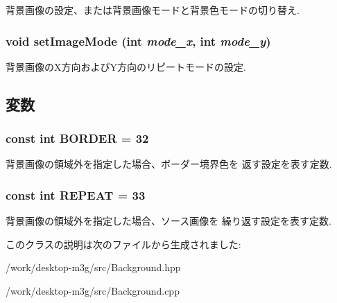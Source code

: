 背景画像の設定、または背景画像モードと背景色モードの切り替え. \hypertarget{classm3g_1_1Background_aba37cb460a2376f1a4722eebb4de9a9}{
\subsubsection[{setImageMode}]{\setlength{\rightskip}{0pt plus 5cm}void setImageMode (int {\em mode\_\-x}, \/  int {\em mode\_\-y})}}
\label{classm3g_1_1Background_aba37cb460a2376f1a4722eebb4de9a9}


背景画像のX方向およびY方向のリピートモードの設定. 

\subsection{変数}
\hypertarget{classm3g_1_1Background_ee380e01b33e589c24984e4c4c1c6501}{
\subsubsection[{BORDER}]{\setlength{\rightskip}{0pt plus 5cm}const int {\bf BORDER} = 32}}
\label{classm3g_1_1Background_ee380e01b33e589c24984e4c4c1c6501}


背景画像の領域外を指定した場合、ボーダー境界色を 返す設定を表す定数. \hypertarget{classm3g_1_1Background_a466d02b3d88f856854d0a0955be32e8}{
\subsubsection[{REPEAT}]{\setlength{\rightskip}{0pt plus 5cm}const int {\bf REPEAT} = 33}}
\label{classm3g_1_1Background_a466d02b3d88f856854d0a0955be32e8}


背景画像の領域外を指定した場合、ソース画像を 繰り返す設定を表す定数. 

このクラスの説明は次のファイルから生成されました:\begin{CompactItemize}
\item 
/work/desktop-m3g/src/Background.hpp\item 
/work/desktop-m3g/src/Background.cpp\end{CompactItemize}
